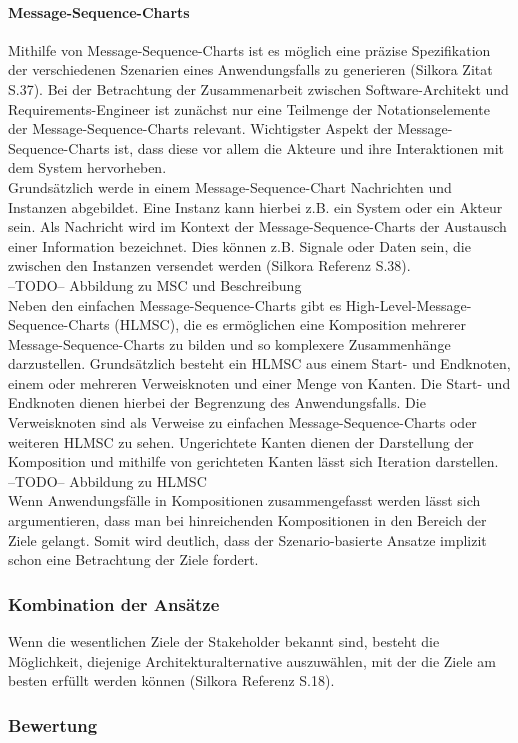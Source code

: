 \paragraph{Message-Sequence-Charts}
Mithilfe von Message-Sequence-Charts ist es möglich eine präzise Spezifikation der verschiedenen Szenarien eines Anwendungsfalls zu generieren (Silkora Zitat S.37). Bei der Betrachtung der Zusammenarbeit zwischen Software-Architekt und Requirements-Engineer ist zunächst nur eine Teilmenge der Notationselemente der Message-Sequence-Charts relevant. Wichtigster Aspekt der Message-Sequence-Charts ist, dass diese vor allem die Akteure und ihre Interaktionen mit dem System hervorheben.\\
Grundsätzlich werde in einem Message-Sequence-Chart Nachrichten und Instanzen abgebildet. Eine Instanz kann hierbei z.B. ein System oder ein Akteur sein. Als Nachricht wird im Kontext der Message-Sequence-Charts der Austausch einer Information bezeichnet. Dies können z.B. Signale oder Daten sein, die zwischen den Instanzen versendet werden (Silkora Referenz S.38). \\

--TODO-- Abbildung zu MSC und Beschreibung\\

Neben den einfachen Message-Sequence-Charts gibt es High-Level-Message-Sequence-Charts (HLMSC), die es ermöglichen eine Komposition mehrerer Message-Sequence-Charts zu bilden und so komplexere Zusammenhänge darzustellen. Grundsätzlich besteht ein HLMSC aus einem Start- und Endknoten, einem oder mehreren Verweisknoten und einer Menge von Kanten. Die Start- und Endknoten dienen hierbei der Begrenzung des Anwendungsfalls.  Die Verweisknoten sind als Verweise zu einfachen Message-Sequence-Charts oder weiteren HLMSC zu sehen. Ungerichtete Kanten dienen der Darstellung der Komposition und mithilfe von gerichteten Kanten lässt sich Iteration darstellen.\\

--TODO-- Abbildung zu HLMSC \\

Wenn Anwendungsfälle in Kompositionen zusammengefasst werden lässt sich argumentieren, dass man bei hinreichenden Kompositionen in den Bereich der Ziele gelangt. Somit wird deutlich, dass der Szenario-basierte Ansatze implizit schon eine Betrachtung der Ziele fordert.

\subsubsection{Kombination der Ans\"atze}
Wenn die wesentlichen Ziele der Stakeholder bekannt sind, besteht die M\"oglichkeit, diejenige Architekturalternative auszuw\"ahlen, mit der die Ziele am besten erf\"ullt werden k\"onnen (Silkora Referenz S.18).\\

\subsubsection{Bewertung}
